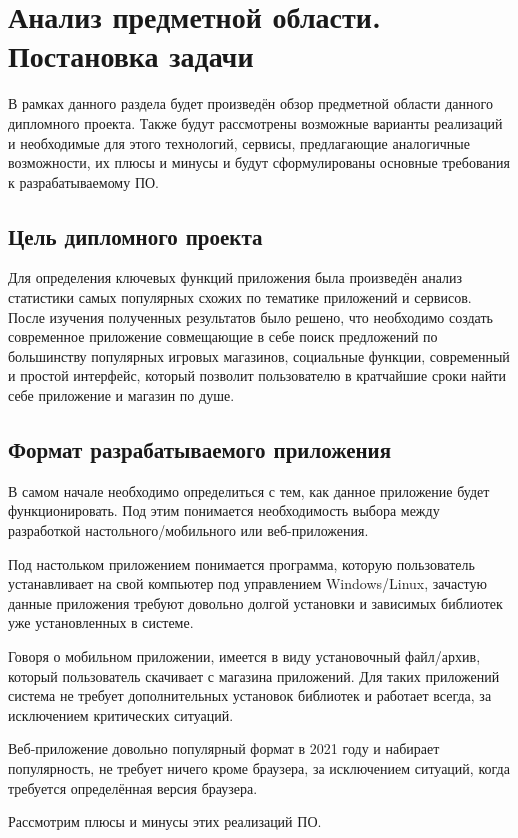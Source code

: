 \section{Анализ предметной области. Постановка задачи}
\label{sec:domain}
 
В рамках данного раздела будет произведён обзор предметной области данного дипломного проекта.
Также будут рассмотрены возможные варианты реализаций и необходимые для этого технологий, сервисы, предлагающие аналогичные возможности, их плюсы и минусы и будут сформулированы основные требования к разрабатываемому ПО.
 
\subsection{Цель дипломного проекта}
Для определения ключевых функций приложения была произведён анализ статистики самых популярных схожих по тематике приложений и сервисов. После изучения полученных результатов было решено, что необходимо создать современное приложение совмещающие в себе поиск предложений по большинству популярных игровых магазинов, социальные функции, современный и простой интерфейс, который позволит пользователю в кратчайшие сроки найти себе приложение и магазин по душе.

\subsection{Формат разрабатываемого приложения}
В самом начале необходимо определиться с тем, как данное приложение будет функционировать. Под этим понимается необходимость выбора между разработкой настольного/мобильного или веб-приложения.
 
Под настольком приложением понимается программа, которую пользователь устанавливает на свой компьютер под управлением Windows/Linux, зачастую данные приложения требуют довольно долгой установки и зависимых библиотек уже установленных в системе.

Говоря о мобильном приложении, имеется в виду установочный файл/архив, который пользователь скачивает с магазина приложений. Для таких приложений система не требует дополнительных установок библиотек и работает всегда, за исключением критических ситуаций.

Веб-приложение довольно популярный формат в 2021 году и набирает популярность, не требует ничего кроме браузера, за исключением ситуаций, когда требуется определённая версия браузера.

Рассмотрим плюсы и минусы этих реализаций ПО.

